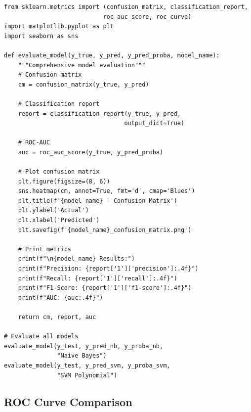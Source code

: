 \documentclass[12pt,a4paper,twoside]{book}
\begin{document}
\begin{tcolorbox}[myCustomStyle={Evaluation Metrics}]
    \begin{lstlisting}[style=myPythonStyle]
from sklearn.metrics import (confusion_matrix, classification_report,
                            roc_auc_score, roc_curve)
import matplotlib.pyplot as plt
import seaborn as sns

def evaluate_model(y_true, y_pred, y_pred_proba, model_name):
    """Comprehensive model evaluation"""
    # Confusion matrix
    cm = confusion_matrix(y_true, y_pred)
    
    # Classification report
    report = classification_report(y_true, y_pred, 
                                  output_dict=True)
    
    # ROC-AUC
    auc = roc_auc_score(y_true, y_pred_proba)
    
    # Plot confusion matrix
    plt.figure(figsize=(8, 6))
    sns.heatmap(cm, annot=True, fmt='d', cmap='Blues')
    plt.title(f'{model_name} - Confusion Matrix')
    plt.ylabel('Actual')
    plt.xlabel('Predicted')
    plt.savefig(f'{model_name}_confusion_matrix.png')
    
    # Print metrics
    print(f"\n{model_name} Results:")
    print(f"Precision: {report['1']['precision']:.4f}")
    print(f"Recall: {report['1']['recall']:.4f}")
    print(f"F1-Score: {report['1']['f1-score']:.4f}")
    print(f"AUC: {auc:.4f}")
    
    return cm, report, auc

# Evaluate all models
evaluate_model(y_test, y_pred_nb, y_proba_nb, 
               "Naive Bayes")
evaluate_model(y_test, y_pred_svm, y_proba_svm, 
               "SVM Polynomial")
\end{lstlisting}
\end{tcolorbox}

\subsection{ROC Curve Comparison}
\end{document}
